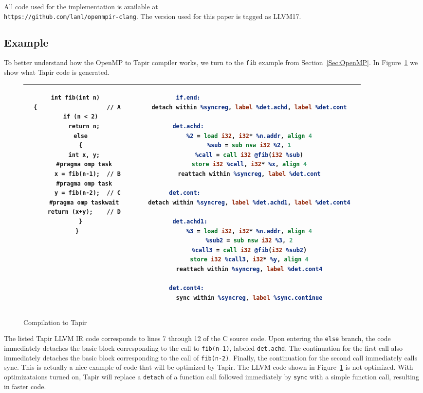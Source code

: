 \documentclass[sigconf]{acmart}
\begin{document}
All code used for the implementation is available at \\
\texttt{https://github.com/lanl/openmpir-clang}. The version used for this
paper is tagged as LLVM17.

\subsection{Example} \label{Sec:Example}

To better understand how the OpenMP to Tapir compiler works, we turn to the
\texttt{fib} example from Section~\ref{Sec:OpenMP}. In Figure~\ref{Fig:Example}
we show what Tapir code is generated.  

\begin{figure}
\begin{tabular}{| c c c | c c c |}
\hline
 & 
\begin{lstlisting}
int fib(int n) 
{                    // A
  if (n < 2)
    return n;
  else
  {
    int x, y;
    #pragma omp task
      x = fib(n-1);  // B
    #pragma omp task
      y = fib(n-2);  // C
    #pragma omp taskwait
    return (x+y);    // D
  }
}
\end{lstlisting}
& & &
\begin{lstlisting}[language=llvm]
if.end:                                 
  detach within %syncreg, label %det.achd, label %det.cont

det.achd:                                 
  %2 = load i32, i32* %n.addr, align 4
  %sub = sub nsw i32 %2, 1
  %call = call i32 @fib(i32 %sub)
  store i32 %call, i32* %x, align 4
  reattach within %syncreg, label %det.cont

det.cont:                                   
  detach within %syncreg, label %det.achd1, label %det.cont4

det.achd1:                                
  %3 = load i32, i32* %n.addr, align 4
  %sub2 = sub nsw i32 %3, 2
  %call3 = call i32 @fib(i32 %sub2)
  store i32 %call3, i32* %y, align 4
  reattach within %syncreg, label %det.cont4

det.cont4:                                  
  sync within %syncreg, label %sync.continue
\end{lstlisting}
 &  \\
\hline
\end{tabular}

\caption{Compilation to Tapir}
\label{Fig:Example}
\end{figure}

The listed Tapir LLVM IR code corresponds to lines 7 through 12 of the C source
code.  Upon entering the \texttt{else} branch, the code immediately detaches
the basic block corresponding to the call to \texttt{fib(n-1)}, labeled
\texttt{det.achd}. The continuation for the first call also immediately
detaches the basic block corresponding to the call of \texttt{fib(n-2)}.
Finally, the continuation for the second call immediately calls sync. This is
actually a nice example of code that will be optimized by Tapir. The LLVM code
shown in Figure~\ref{Fig:Example} is not optimized. With optimizataions turned
on, Tapir will replace a \texttt{detach} of a function call followed
immediately by \texttt{sync} with a simple function call, resulting in faster
code. 
\end{document}
